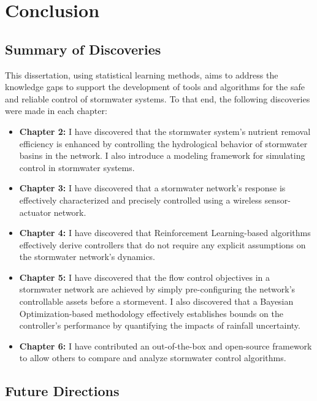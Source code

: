 \chapter{Conclusion}\label{ch:conclusion}
\section{Summary of Discoveries}

This dissertation, using statistical learning methods, aims to address the knowledge gaps to support the development of tools and algorithms for the safe and reliable control of stormwater systems.
To that end, the following discoveries were made in each chapter:

\begin{itemize}
	\item \textbf{Chapter 2:} I have discovered that the stormwater system's nutrient removal efficiency is enhanced by controlling the hydrological behavior of stormwater basins in the network. I also introduce a modeling framework for simulating control in stormwater systems.
	\item \textbf{Chapter 3:} I have discovered that a stormwater network's response is effectively characterized and precisely controlled using a wireless sensor-actuator network.  
	\item \textbf{Chapter 4:} I have discovered that Reinforcement Learning-based algorithms effectively derive controllers that do not require any explicit assumptions on the stormwater network's dynamics.
	\item \textbf{Chapter 5:} I have discovered that the flow control objectives in a stormwater network are achieved by simply pre-configuring the network's controllable assets before a stormevent. I also discovered that a Bayesian Optimization-based methodology effectively establishes bounds on the controller’s performance by quantifying the impacts of rainfall uncertainty. 
	\item \textbf{Chapter 6:} I have contributed an out-of-the-box and open-source framework to allow others to compare and analyze stormwater control algorithms. 
\end{itemize}

\section{Future Directions}

